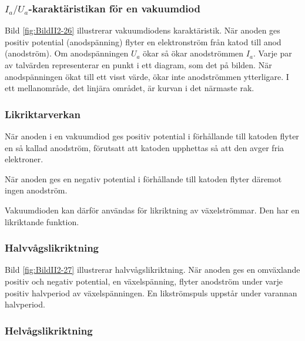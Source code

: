 \subsubsection{\(I_a/U_a\)-karaktäristikan för en vakuumdiod}


Bild \ref{fig:BildII2-26} illustrerar vakuumdiodens karaktäristik.
När anoden ges positiv potential (anodspänning) flyter en elektronström från
katod till anod (anodström).
Om anodspänningen \(U_a\) ökar så ökar anodströmmen \(I_a\).
Varje par av talvärden representerar en punkt i ett diagram, som det på bilden.
När anodspänningen ökat till ett visst värde, ökar inte anodströmmen ytterligare.
I ett mellanområde, det linjära området, är kurvan i det närmaste rak.

\subsubsection{Likriktarverkan}

När anoden i en vakuumdiod ges positiv potential i förhållande till katoden
flyter en så kallad anodström, förutsatt att katoden upphettas så att den avger
fria elektroner.

När anoden ges en negativ potential i förhållande till katoden flyter däremot
ingen anodström.

Vakuumdioden kan därför användas för likriktning av växelströmmar.
Den har en likriktande funktion.

\subsubsection{Halvvågslikriktning}


Bild \ref{fig:BildII2-27} illustrerar halvvågslikriktning.
När anoden ges en omväxlande positiv och negativ potential, en växelspänning,
flyter anodström under varje positiv halvperiod av växelspänningen.
En likströmspuls uppstår under varannan halvperiod.

\subsubsection{Helvågslikriktning}


